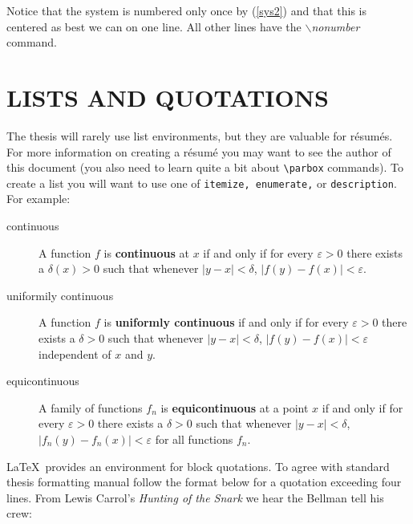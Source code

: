 Notice that the system is numbered only once by (\ref{sys2}) and that
this is centered as best we can on one line. All other lines have the
$\backslash$\textit{nonumber} command.


\chapter{LISTS AND QUOTATIONS}

The thesis will rarely use list environments, but they are valuable
for r{\'e}sum{\'e}s. For more information on creating a r{\'e}sum{\'e}
you may want to see the author of this document (you also need to
learn quite a bit about \verb+\parbox+ commands).  To create a list
you will want to use one of \texttt{itemize, enumerate,} or
\texttt{description}. For example:
\begin{description}
\item[continuous] A function $f$ is {\bf continuous} at $x$ if and only
if for every $\varepsilon >0$ there exists a $\delta(x) >0$ such that
whenever $|y-x|<\delta$, $|f(y)-f(x)| < \varepsilon$.
\item[uniformily continuous] A function $f$ is {\bf uniformly
continuous} if and only if for every $\varepsilon >0$ there exists a
$\delta >0$ such that whenever $|y-x|<\delta$, $|f(y)-f(x)| <
\varepsilon$ independent of $x$ and $y$.
\item[equicontinuous] A family of functions $f_n$ is {\bf
equicontinuous} at a point $x$ if and only if for every $\varepsilon >0$
there exists a $\delta >0$ such that whenever $|y-x|<\delta$,
$|f_n(y)-f_n(x)| < \varepsilon$ for all functions $f_n$.
\end{description}

\LaTeX\ provides an environment for block quotations. To agree with standard 
thesis formatting manual follow the format below for a quotation exceeding four
lines. From Lewis Carrol's {\it Hunting of the Snark} we hear the
Bellman tell his crew:
 \vspace{.12pt}

